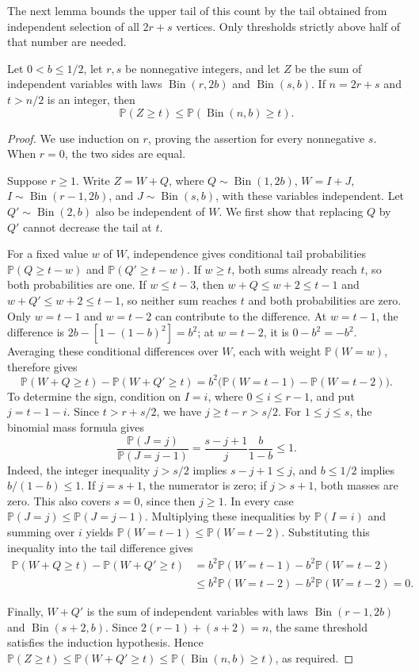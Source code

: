 \documentclass[12pt]{article}
\DeclareMathOperator{\Bin}{Bin}
\newcommand{\Pp}{\mathbb P}
\begin{document}
The next lemma bounds the upper tail of this count by the tail obtained from independent selection of all \(2r+s\) vertices. Only thresholds strictly above half of that number are needed.
\begin{lemma}\label{lem:pairtail}
Let \(0<b\le1/2\), let \(r,s\) be nonnegative integers, and let \(Z\) be the sum of independent variables with laws \(\Bin(r,2b)\) and \(\Bin(s,b)\). If \(n=2r+s\) and \(t>n/2\) is an integer, then
\begin{equation}\label{eq:pairtail}
\Pp(Z\ge t)\le\Pp(\Bin(n,b)\ge t).
\end{equation}
\end{lemma}
\begin{proof}
We use induction on \(r\), proving the assertion for every nonnegative \(s\). When \(r=0\), the two sides are equal.

Suppose \(r\ge1\). Write \(Z=W+Q\), where \(Q\sim\Bin(1,2b)\), \(W=I+J\), \(I\sim\Bin(r-1,2b)\), and \(J\sim\Bin(s,b)\), with these variables independent. Let \(Q'\sim\Bin(2,b)\) also be independent of \(W\). We first show that replacing \(Q\) by \(Q'\) cannot decrease the tail at \(t\).

For a fixed value \(w\) of \(W\), independence gives conditional tail probabilities \(\Pp(Q\ge t-w)\) and \(\Pp(Q'\ge t-w)\). If \(w\ge t\), both sums already reach \(t\), so both probabilities are one. If \(w\le t-3\), then \(w+Q\le w+2\le t-1\) and \(w+Q'\le w+2\le t-1\), so neither sum reaches \(t\) and both probabilities are zero. Only \(w=t-1\) and \(w=t-2\) can contribute to the difference. At \(w=t-1\), the difference is \(2b-[1-(1-b)^2]=b^2\); at \(w=t-2\), it is \(0-b^2=-b^2\). Averaging these conditional differences over \(W\), each with weight \(\Pp(W=w)\), therefore gives
\[
\Pp(W+Q\ge t)-\Pp(W+Q'\ge t)
=b^2\bigl(\Pp(W=t-1)-\Pp(W=t-2)\bigr).
\]
To determine the sign, condition on \(I=i\), where \(0\le i\le r-1\), and put \(j=t-1-i\). Since \(t>r+s/2\), we have \(j\ge t-r>s/2\). For \(1\le j\le s\), the binomial mass formula gives
\[
\frac{\Pp(J=j)}{\Pp(J=j-1)}
=\frac{s-j+1}{j}\frac{b}{1-b}\le1.
\]
Indeed, the integer inequality \(j>s/2\) implies \(s-j+1\le j\), and \(b\le1/2\) implies \(b/(1-b)\le1\). If \(j=s+1\), the numerator is zero; if \(j>s+1\), both masses are zero. This also covers \(s=0\), since then \(j\ge1\). In every case \(\Pp(J=j)\le\Pp(J=j-1)\). Multiplying these inequalities by \(\Pp(I=i)\) and summing over \(i\) yields \(\Pp(W=t-1)\le\Pp(W=t-2)\). Substituting this inequality into the tail difference gives
\[
\begin{aligned}
\Pp(W+Q\ge t)-\Pp(W+Q'\ge t)
&=b^2\Pp(W=t-1)-b^2\Pp(W=t-2)\\
&\le b^2\Pp(W=t-2)-b^2\Pp(W=t-2)=0.
\end{aligned}
\]

Finally, \(W+Q'\) is the sum of independent variables with laws \(\Bin(r-1,2b)\) and \(\Bin(s+2,b)\). Since \(2(r-1)+(s+2)=n\), the same threshold satisfies the induction hypothesis. Hence \(\Pp(Z\ge t)\le\Pp(W+Q'\ge t)\le\Pp(\Bin(n,b)\ge t)\), as required.
\end{proof}
\end{document}
